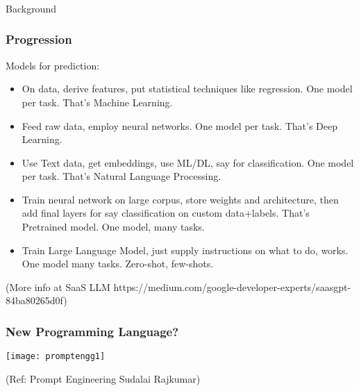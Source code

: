 \begin{frame}[fragile]\frametitle{}
\begin{center}
{\Large Background}
\end{center}
\end{frame}

\begin{frame}[fragile]\frametitle{Progression}

Models for prediction:

\begin{itemize}
\item On data, derive features, put statistical techniques like regression. One model per task. That's Machine Learning.
\item Feed raw data, employ neural networks. One model per task. That's Deep Learning.
\item Use Text data, get embeddings, use ML/DL, say for classification. One model per task. That's Natural Language Processing.
\item Train neural network on large corpus, store weights and architecture, then add final layers for say classification on custom data+labels. That's Pretrained model. One model, many tasks.
\item Train Large Language Model, just supply instructions on what to do, works. One model many tasks. Zero-shot, few-shots.
\end{itemize}

{\tiny (More info at SaaS LLM https://medium.com/google-developer-experts/saasgpt-84ba80265d0f)}

\end{frame}


\begin{frame}[fragile]\frametitle{New Programming Language?}

\begin{center}
\texttt{[image: promptengg1]}

{\tiny (Ref: Prompt Engineering Sudalai Rajkumar)}

\end{center}				

\end{frame}




